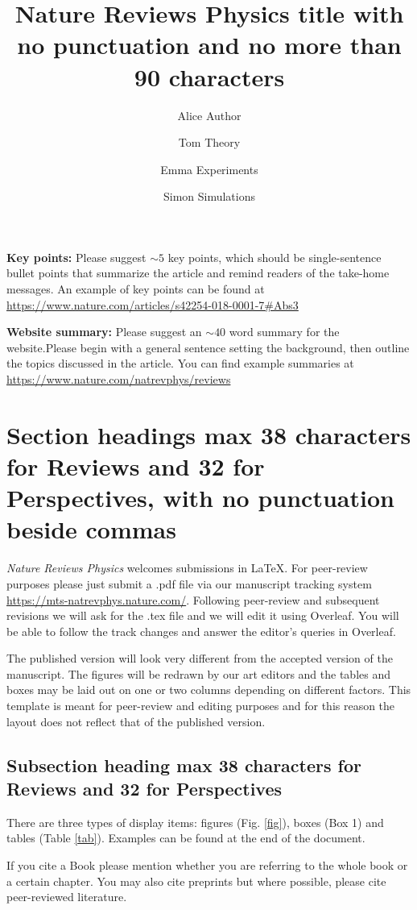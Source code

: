 \documentclass[fleqn,10pt]{wlscirep}
\title{Nature Reviews Physics title with no punctuation and no more than 90 characters}
\author[1,*]{Alice Author}
\author[2]{Tom Theory}
\author[1,2]{Emma Experiments}
\author[2]{Simon Simulations}
\affil[1]{Affiliation, Department, City, Country}
\affil[2]{Affiliation, Department, City, Country}
\affil[*]{e-mail: alice.author@email.edu}
\begin{document}
\flushbottom
\maketitle

\thispagestyle{empty}

\noindent \textbf{Key points:} Please suggest $\sim 5$ key points, which should be single-sentence bullet points that summarize the article and remind readers of the take-home messages. An example of key points can be found at \url{https://www.nature.com/articles/s42254-018-0001-7#Abs3}

\noindent \textbf{Website summary:} Please suggest an $\sim 40$ word summary for the website.Please begin with a general sentence setting the background, then outline the topics discussed in the article. You can find example summaries at \url{https://www.nature.com/natrevphys/reviews}

\section*{Section headings max 38 characters for Reviews and 32 for Perspectives, with no punctuation beside commas}
\textit{Nature Reviews Physics} welcomes submissions in \LaTeX. For  peer-review purposes please just submit a .pdf file via our manuscript tracking system \url{https://mts-natrevphys.nature.com/}. Following peer-review and subsequent revisions we will ask for the .tex file and we will edit it using Overleaf. You will be able to follow the track changes and answer the editor's queries in Overleaf.

The published version will look very different from the accepted version of the manuscript. The figures will be redrawn by our art editors and the tables and boxes may be laid out  on one or two columns depending on different factors. This template is meant for peer-review and editing purposes and for this reason the layout does not reflect that of the published version. 

\subsection*{Subsection heading max 38 characters for Reviews and 32 for Perspectives}
There are three types of display items: figures (Fig. \ref{fig}), boxes (Box 1) and tables (Table \ref{tab}). Examples can be found at the end of the document.

If you cite a Book \cite{Book} please mention whether you are referring to the whole book or a certain chapter. You may also cite preprints\cite{arxiv} but where possible, please cite peer-reviewed literature.
\end{document}

